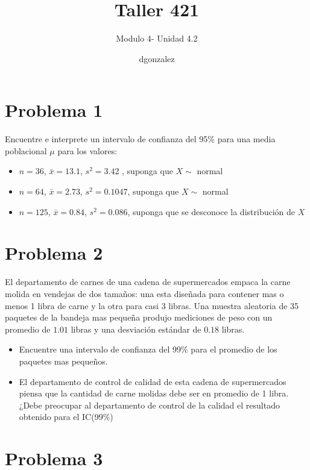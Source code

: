 \documentclass[
]{article}
\title{\textbf{Taller 421}}
\subtitle{Modulo 4- Unidad 4.2}
\author{dgonzalez}
\date{}
\begin{document}
\maketitle

{
\setcounter{tocdepth}{2}
\tableofcontents
}
\hypertarget{problema-1}{%
\section{\texorpdfstring{\textbf{Problema
1}}{Problema 1}}\label{problema-1}}

Encuentre e interprete un intervalo de confianza del 95\% para una media
poblacional \(\mu\) para los valores:

\begin{itemize}
\item
  \(n=36\), \(\bar{x}= 13.1\), \(s^{2}=3.42\) , suponga que \(X\sim\)
  normal
\item
  \(n=64\), \(\bar{x}= 2.73\), \(s^{2}=0.1047\), suponga que \(X \sim\)
  normal
\item
  \(n=125\), \(\bar{x}=0.84\), \(s^{2}=0.086\), suponga que se desconoce
  la distribución de \(X\)
\end{itemize}

\hypertarget{problema-2}{%
\section{\texorpdfstring{\textbf{Problema
2}}{Problema 2}}\label{problema-2}}

El departamento de carnes de una cadena de supermercados empaca la carne
molida en vendejas de dos tamaños: una esta diseñada para contener mas o
menos 1 libra de carne y la otra para casi 3 libras. Una muestra
aleatoria de 35 paquetes de la bandeja mas pequeña produjo mediciones de
peso con un promedio de \(1.01\) libras y una desviación estándar de
\(0.18\) libras.

\begin{itemize}
\item
  Encuentre una intervalo de confianza del 99\% para el promedio de los
  paquetes mas pequeños.
\item
  El departamento de control de calidad de esta cadena de supermercados
  piensa que la cantidad de carne molidas debe ser en promedio de 1
  libra. ¿Debe preocupar al departamento de control de la calidad el
  resultado obtenido para el IC(99\%)
\end{itemize}

\hypertarget{problema-3}{%
\section{\texorpdfstring{\textbf{Problema
3}}{Problema 3}}\label{problema-3}}
\end{document}

